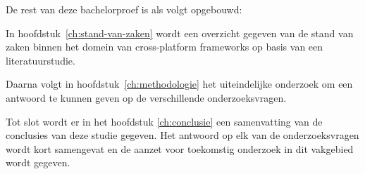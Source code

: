 
De rest van deze bachelorproef is als volgt opgebouwd:

In hoofdstuk~\ref{ch:stand-van-zaken} wordt een overzicht gegeven van de stand
van zaken binnen het domein van cross-platform frameworks op basis van een literatuurstudie.

Daarna volgt in hoofdstuk~\ref{ch:methodologie} het uiteindelijke onderzoek om een antwoord te kunnen geven op de verschillende onderzoeksvragen.


Tot slot wordt er in het hoofdstuk \ref{ch:conclusie} een samenvatting van de conclusies van deze studie gegeven. Het antwoord op elk van de onderzoeksvragen wordt kort samengevat en de aanzet voor toekomstig onderzoek in dit vakgebied wordt gegeven.



